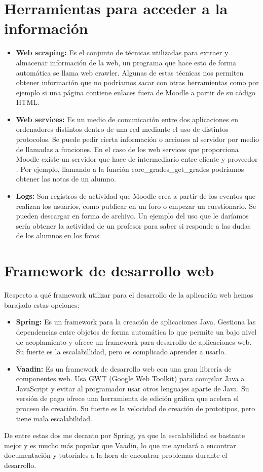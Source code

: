 \section{Herramientas para acceder a la información}
\begin{itemize}
	\item \textbf{Web scraping:}
	Es el conjunto de técnicas utilizadas para extraer y almacenar información de la web, un programa que hace esto de forma automática se llama web crawler. Algunas de estas técnicas nos permiten obtener información que no podríamos sacar con otras herramientas como por ejemplo si una página contiene enlaces fuera de Moodle a partir de su código HTML.
	\item \textbf{Web services:}
	Es un medio de comunicación entre dos aplicaciones en ordenadores distintos dentro de una red mediante el uso de distintos protocolos. Se puede pedir cierta información o acciones al servidor por medio de llamadas a funciones. En el caso de los web services que proporciona Moodle existe un servidor que hace de intermediario entre cliente y proveedor \cite{moodle-2020}. Por ejemplo, llamando a la función core\_grades\_get\_grades podríamos obtener las notas de un alumno.
	\item \textbf{Logs:}
	Son registros de actividad que Moodle crea a partir de los eventos que realizan los usuarios, como publicar en un foro o empezar un cuestionario. Se pueden descargar en forma de archivo. Un ejemplo del uso que le daríamos sería obtener la actividad de un profesor para saber si responde a las dudas de los alumnos en los foros.
\end{itemize}
\section{Framework de desarrollo web }
Respecto a qué framework utilizar para el desarrollo de la aplicación web hemos barajado estas opciones:
\begin{itemize}
	\item \textbf{Spring:}
	Es un framework para la creación de aplicaciones Java. Gestiona las dependencias entre objetos de forma automática lo que permite un bajo nivel de acoplamiento y ofrece un framework para desarrollo de aplicaciones web. Su fuerte es la escalabillidad, pero es complicado aprender a usarlo.
	\item \textbf{Vaadin:}
	Es un framework de desarrollo web con una gran librería de componentes web. Usa GWT (Google Web Toolkit) para compilar Java a JavaScript y evitar al programador usar otros lenguajes aparte de Java. Su versión de pago ofrece una herramienta de edición gráfica que acelera el proceso de creación. Su fuerte es la velocidad de creación de prototipos, pero tiene mala escalabilidad.
\end{itemize}

De entre estas dos me decanto por Spring, ya que la escalabilidad es bastante mejor y es mucho más popular que Vaadin, lo que me ayudará a encontrar documentación y tutoriales a la hora de encontrar problemas durante el desarrollo.